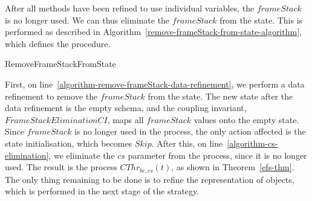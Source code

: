 After all methods have been refined to use individual variables, the
$frameStack$ is no longer used.
We can thus eliminate the $frameStack$ from the state. 
This is performed as described in
Algorithm~\ref{remove-frameStack-from-state-algorithm}, which defines
the  procedure.

\begin{algorithm}
  \begin{algorithmic}
    \State {}
    \label{algorithm-remove-frameStack-data-refinement}
    \State {}
    \label{algorithm-cs-elimination}
  \end{algorithmic}
  \caption{RemoveFrameStackFromState}
  \label{remove-frameStack-from-state-algorithm}
\end{algorithm}

First, on line~\ref{algorithm-remove-frameStack-data-refinement}, we
perform a data refinement to remove the $frameStack$ from the state.
The new state after the data refinement is the empty schema, and the
coupling invariant, $FrameStackEliminationCI$, maps all $frameStack$
values onto the empty state.
Since $frameStack$ is no longer used in the process, the only action
affected is the state initialisation, which becomes $Skip$.
After this, on line~\ref{algorithm-cs-elimination}, we eliminate the
$cs$ parameter from the process, since it is no longer used.
The result is the process $CThr_{bc,cs}(t)$, as shown in
Theorem~\ref{efs-thm}.
The only thing remaining to be done is to refine the representation of
objects, which is performed in the next stage of the strategy.
